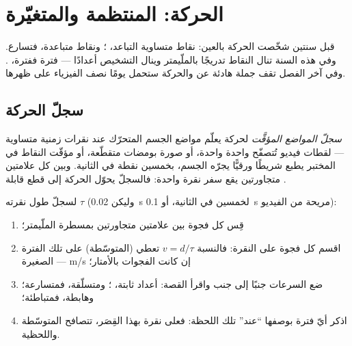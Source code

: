 \chapter{الحركة: المنتظمة والمتغيّرة}\label{ch:g9:uniform-varied-motion}

قبل سنتين شخّصت الحركة بالعين: نقاط متساوية التباعد، ؛ ونقاط متباعدة، فتسارع. وفي هذه السنة تنال النقاط
تدريجًا بالملّيمتر وينال التشخيص أعدادًا --- فترة ففترة، 
. وفي آخر الفصل تقف جملة هادئة عن  والحركة ستحمل
يومًا نصف الفيزياء على ظهرها.

\section{سجلّ الحركة}

\begin{definition}\label{def:g9:uniform-varied-motion:record}
\emph{سجلّ المواضع المؤقَّت} لحركة
يعلّم مواضع الجسم المتحرّك عند نقرات زمنية متساوية --- لقطات
فيديو تُتصفّح واحدة واحدة، أو صورة بومضات متقطّعة، أو مؤقّت
النقاط في المختبر يطبع شريطًا ورقيًّا يجرّه الجسم، بخمسين نقطة
في الثانية. وبين كل علامتين متجاورتين يقع سفر نقرة واحدة:
فالسجلّ يحوّل الحركة إلى قطع قابلة .
\end{definition}

\begin{method}\label{met:g9:uniform-varied-motion:read}
لسجلّ طول نقرته $\tau$ (وليكن \qty{0.02}{s} لخمسين في الثانية،
أو \qty{0.1}{s} مريحة من الفيديو):
\begin{enumerate}
  \item قِس كل فجوة بين علامتين متجاورتين بمسطرة الملّيمتر؛
  \item اقسم كل فجوة على النقرة: فالنسبة $v = d/\tau$ تعطي 
        (المتوسّطة) على تلك الفترة الصغيرة --- 
        \unit{m/s} إن كانت الفجوات بالأمتار؛
  \item ضع السرعات جنبًا إلى جنب واقرأ القصة: أعداد ثابتة،
        ؛ ومتسلّقة، فمتسارعة؛ وهابطة، فمتباطئة؛
  \item اذكر  أيّ فترة بوصفها  ``عند'' تلك اللحظة:
        فعلى نقرة بهذا القِصَر، تتصافح المتوسّطة واللحظية.
\end{enumerate}
\end{method}

